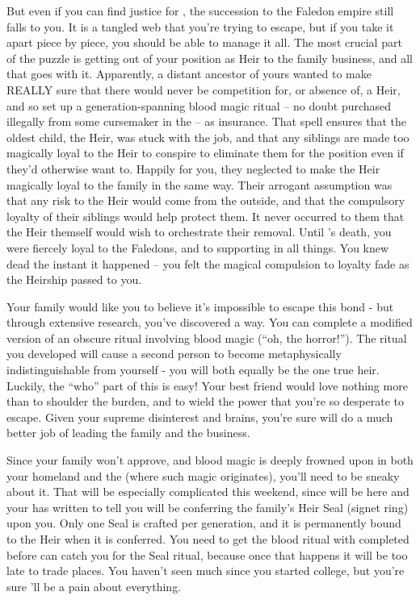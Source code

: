 \documentclass[char]{GL2020}
\begin{document}
But even if you can find justice for \cHeirSibling{}, the succession to the Faledon empire still falls to you. It is a tangled web that you're trying to escape, but if you take it apart piece by piece, you should be able to manage it all. The most crucial part of the puzzle is getting out of your position as Heir to the \cHeir{\formal} family business, and all that goes with it. Apparently, a distant ancestor of yours wanted to make REALLY sure that there would never be competition for, or absence of, a \cHeir{\formal} Heir, and so set up a generation-spanning blood magic ritual – no doubt purchased illegally from some cursemaker in the \pFarm{} – as insurance. That spell ensures that the oldest child, the Heir, was stuck with the job, and that any siblings are made too magically loyal to the Heir to conspire to eliminate them for the position even if they'd otherwise want to. Happily for you, they neglected to make the Heir magically loyal to the family in the same way. Their arrogant assumption was that any risk to the Heir would come from the outside, and that the compulsory loyalty of their siblings would help protect them. It never occurred to them that the Heir themself would wish to orchestrate their removal. Until \cHeirSibling{}'s death, you were fiercely loyal to the Faledons, and to supporting \cHeirSibling{} in all things. You knew \cHeirSibling{\they} \cHeirSibling{\were} dead the instant it happened – you felt the magical compulsion to loyalty fade as the Heirship passed to you.

Your family would like you to believe it's impossible to escape this bond - but through extensive research, you've discovered a way. You can complete a modified version of an obscure ritual involving blood magic (``oh, the horror!''). The ritual you developed will cause a second person to become metaphysically indistinguishable from yourself - you will both equally be the one true heir. Luckily, the ``who'' part of this is easy!  Your best friend \cAmbition{\full} would love nothing more than to shoulder the burden, and to wield the power that you're so desperate to escape. Given your supreme disinterest and \cAmbition{\their} brains, you're sure \cAmbition{\they} will do a much better job of leading the family and the business.  

Since your family won't approve, and blood magic is deeply frowned upon in both your homeland and the \pFarm{} (where such magic originates), you'll need to be sneaky about it. That will be especially complicated this weekend, since \cDiplomat{\full} will be here and your \cFaledonParent{\parent} has written to tell you \cDiplomat{\they} will be conferring the family's Heir Seal (signet ring) upon you. Only one Seal is crafted per generation, and it is permanently bound to the Heir when it is conferred. You need to get the blood ritual with \cAmbition{} completed before \cDiplomat{} can catch you for the Seal ritual, because once that happens it will be too late to trade places. You haven't seen \cDiplomat{} much since you started college, but you're sure \cDiplomat{\they}'ll be a pain about everything. 
\end{document}
